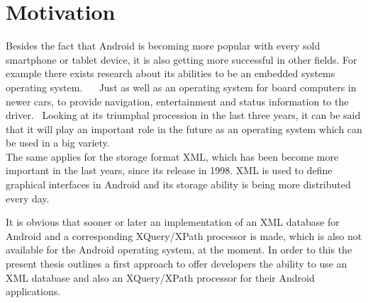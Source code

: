\section{Motivation}
\label{sec:introduction:motivation}
Besides the fact that Android is becoming more popular with every sold smartphone or tablet device, it is also getting more successful in other fields.
For example there exists research about its abilities to be an embedded systems operating system. ~\cite{lee2010evaluating}~\cite{maia2010evaluating}
Just as well as an operating system for board computers in newer cars, to provide navigation, entertainment and status information to the driver.~\cite{macario2009vehicle}
Looking at its triumphal procession in the last three years, it can be said that it will play an important role in the future as an operating system which can be used in a big variety.\\
The same applies for the storage format XML, which has been become more important in the last years, since its release in 1998.
XML is used to define graphical interfaces in Android and its storage ability is being more distributed every day.



It is obvious that sooner or later an implementation of an XML database for Android and a corresponding XQuery/XPath processor is made, which is also not available for the Android operating system, at the moment.
In order to this the present thesis outlines a first approach to offer developers the ability to use an XML database and also an XQuery/XPath processor for their Android applications.



